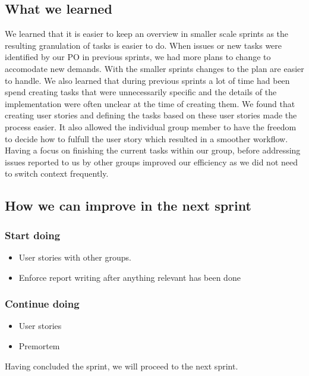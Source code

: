 \subsection{What we learned}
We learned that it is easier to keep an overview in smaller scale sprints as the resulting granulation of tasks is easier to do. When issues or new tasks were identified by our PO in previous sprints, we had more plans to change to accomodate new demands. With the smaller sprints changes to the plan are easier to handle. 
We also learned that during previous sprints a lot of time had been spend creating tasks that were unnecessarily specific and the details of the implementation were often unclear at the time of creating them. We found that creating user stories and defining the tasks based on these user stories made the process easier. It also allowed the individual group member to have the freedom to decide how to fulfull the user story which resulted in a smoother workflow.  
Having a focus on finishing the current tasks within our group, before addressing issues reported to us by other groups improved our efficiency as we did not need to switch context frequently.

\subsection{How we can improve in the next sprint}
\subsubsection{Start doing}
\begin{itemize}
    \item User stories with other groups.
    \item Enforce report writing after anything relevant has been done
\end{itemize}
\subsubsection{Continue doing}
\begin{itemize}
    \item User stories
    \item Premortem
\end{itemize}

Having concluded the sprint, we will proceed to the next sprint.
